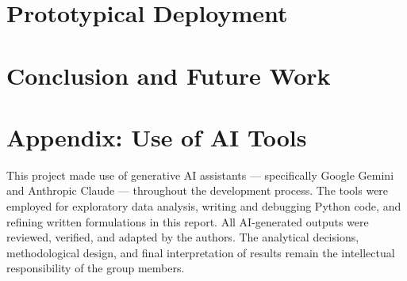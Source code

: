 \documentclass[12pt,a4paper]{article}
\begin{document}
\section{Prototypical Deployment}
\label{sec:deployment}


\section{Conclusion and Future Work}
\label{sec:conclusion}


\clearpage
\printbibliography

\clearpage
\appendix
\section*{Appendix: Use of AI Tools}
\label{sec:ai_declaration}

This project made use of generative AI assistants — specifically Google Gemini and Anthropic Claude — throughout the development process. The tools were employed for exploratory data analysis, writing and debugging Python code, and refining written formulations in this report. All AI-generated outputs were reviewed, verified, and adapted by the authors. The analytical decisions, methodological design, and final interpretation of results remain the intellectual responsibility of the group members.
\end{document}
